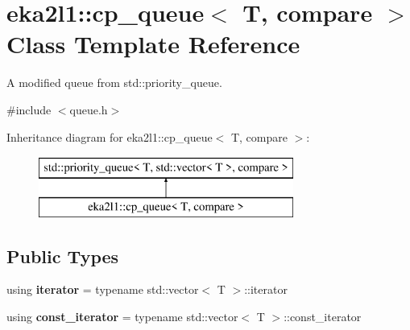 \hypertarget{classeka2l1_1_1cp__queue}{}\section{eka2l1\+:\+:cp\+\_\+queue$<$ T, compare $>$ Class Template Reference}
\label{classeka2l1_1_1cp__queue}


A modified queue from std\+::priority\+\_\+queue.  




{\ttfamily \#include $<$queue.\+h$>$}

Inheritance diagram for eka2l1\+:\+:cp\+\_\+queue$<$ T, compare $>$\+:\begin{figure}[H]
\begin{center}
\leavevmode
\includegraphics[height=2.000000cm]{classeka2l1_1_1cp__queue}
\end{center}
\end{figure}
\subsection*{Public Types}
\begin{DoxyCompactItemize}
\item 
\mbox{\label{classeka2l1_1_1cp__queue_a552b9f87b2d651d1cbc52f332d0540fb}} 
using {\bfseries iterator} = typename std\+::vector$<$ T $>$\+::iterator
\item 
\mbox{\label{classeka2l1_1_1cp__queue_a60bec82d7b8d0e93bdf885ca7e549eb1}} 
using {\bfseries const\+\_\+iterator} = typename std\+::vector$<$ T $>$\+::const\+\_\+iterator
\end{DoxyCompactItemize}
